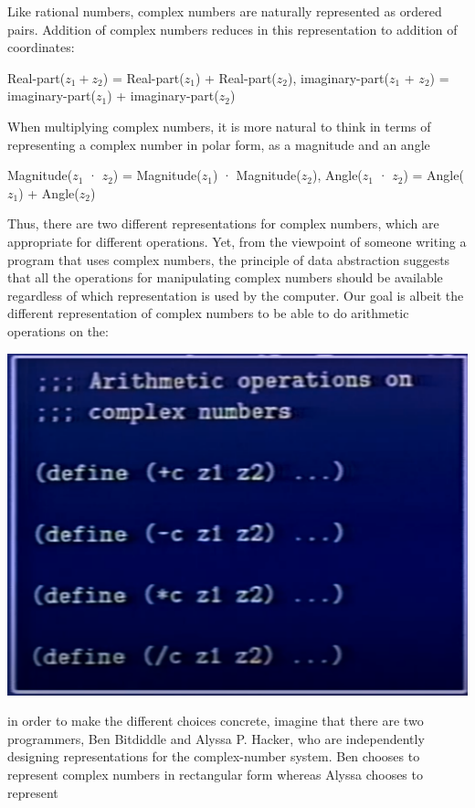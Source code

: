 \documentclass[a4paper,twoside]{article}
\numberwithin{equation}{section}
\begin{document}
Like rational numbers, complex numbers are naturally represented as ordered pairs. Addition of complex
numbers reduces in this representation to addition
of coordinates:
\begin{center}
    Real-part($z_1 + z_2$) = Real-part($z_1$) + Real-part($z_2$),
    imaginary-part($z_1$ + $z_2$) = imaginary-part($z_1$) + imaginary-part($z_2$)
\end{center}
When multiplying complex numbers, it is more natural to think in
terms of representing a complex number in polar form, as a magnitude
and an angle
\begin{center}
    Magnitude($z_1$ · $z_2$) = Magnitude($z_1$) · Magnitude($z_2$),
    Angle($z_1$ · $z_2$) = Angle($z_1$) + Angle($z_2$)
\end{center}
Thus, there are two different representations for complex numbers, which are appropriate for different
operations. Yet, from the viewpoint of someone writing a program that uses complex numbers, the principle
of data abstraction suggests that all the operations for manipulating complex numbers should be available
regardless of which representation is used by the computer. Our goal is albeit the different
representation of complex numbers to be able to do arithmetic operations on the:
\begin{center}
    \includegraphics[scale=0.12]{assets/arithmetic_ops.png}
\end{center}
in order to make the different choices concrete, imagine that there are two programmers, Ben Bitdiddle
and Alyssa P. Hacker, who are independently designing representations for the complex-number system.
Ben chooses to represent complex numbers in rectangular form whereas Alyssa chooses to represent
\end{document}
